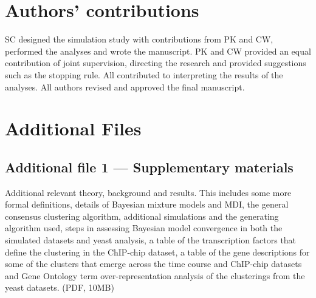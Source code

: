 \documentclass{bmcart}
\begin{document}
\begin{backmatter}
    
    \section*{Authors' contributions}
    SC designed the simulation study with contributions from PK and CW, performed the analyses and wrote the manuscript. PK and CW provided an equal contribution of joint supervision, directing the research and provided suggestions such as the stopping rule. All contributed to interpreting the results of the analyses. All authors revised and approved the final manuscript.
    

\vspace*{-12pt}


  

\section*{Additional Files}
\subsection*{Additional file 1 --- Supplementary materials}
Additional relevant theory, background and results. This includes some more formal definitions, details of Bayesian mixture models and MDI, the general consensus clustering algorithm, additional simulations and the generating algorithm used, steps in assessing Bayesian model convergence in both the simulated datasets and yeast analysis, a table of the transcription factors that define the clustering in the ChIP-chip dataset, a table of the gene descriptions for some of the clusters that emerge across the time course and ChIP-chip datasets and Gene Ontology term over-representation analysis of the clusterings from the yeast datasets. (PDF, 10MB)

\end{backmatter}
\end{document}
